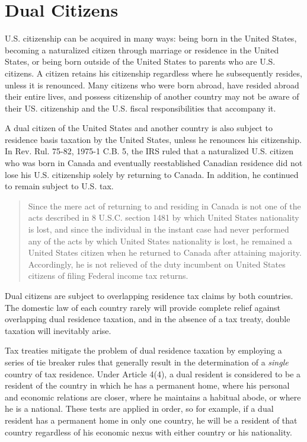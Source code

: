 	
	\section{Dual Citizens}
	
U.S. citizenship can be acquired in many ways: being born in the United States, becoming a naturalized citizen through marriage or residence in the United States, or being born outside of the United States to parents who are U.S. citizens.  A citizen retains his citizenship regardless where he subsequently resides, unless it is renounced.  Many citizens who were born abroad, have resided abroad their entire lives, and possess citizenship of another country may not be aware of their US. citizenship and the U.S. fiscal responsibilities that accompany it.  

A dual citizen of the United States and another country is also subject to residence basis taxation by the United States, unless he renounces his citizenship.  In Rev. Rul. 75-82, 1975-1 C.B. 5, the IRS ruled that a naturalized U.S. citizen who was born in Canada and eventually reestablished Canadian residence did not lose his U.S. citizenship solely by returning to Canada.  In addition, he continued to remain subject to U.S. tax.
\begin{quote}
Since the mere act of returning to and residing in Canada is not one of the acts described in 8 
U.S.C. section 1481 by which United States nationality is lost, and since the individual in the instant case had never performed any of the acts by which United States nationality is lost, he remained a United States citizen when he returned to Canada after attaining majority. Accordingly, he is not relieved of the duty incumbent on United States citizens of filing Federal income tax returns.
\end{quote}

Dual citizens are subject to overlapping residence tax claims by both countries.  The domestic law of each country rarely will provide complete relief against overlapping dual residence taxation, and in the absence of a tax treaty, double taxation will inevitably arise. 

Tax treaties mitigate the problem of dual residence taxation by employing a series of tie breaker rules that generally result in the determination of a \emph{single} country of tax residence.  Under Article 4(4), a dual resident is considered to be a resident of the country in which he has a permanent home, where his personal and economic relations are closer, where he maintains a habitual abode, or where he is a national.  These tests are applied in order, so for example, if a dual resident has a permanent home in only one country, he will be a resident of that country regardless of his economic nexus with either country or his nationality.       

